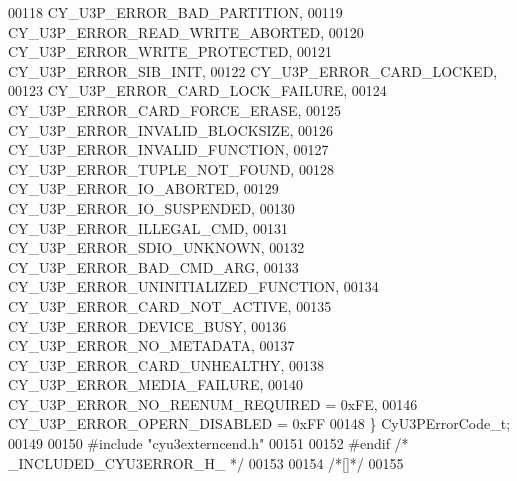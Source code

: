 \begin{DoxyCode}
00118     CY_U3P_ERROR_BAD_PARTITION,                 
00119     CY_U3P_ERROR_READ_WRITE_ABORTED,            
00120     CY_U3P_ERROR_WRITE_PROTECTED,               
00121     CY_U3P_ERROR_SIB_INIT,                      
00122     CY_U3P_ERROR_CARD_LOCKED,                   
00123     CY_U3P_ERROR_CARD_LOCK_FAILURE,             
00124     CY_U3P_ERROR_CARD_FORCE_ERASE,              
00125     CY_U3P_ERROR_INVALID_BLOCKSIZE,             
00126     CY_U3P_ERROR_INVALID_FUNCTION,              
00127     CY_U3P_ERROR_TUPLE_NOT_FOUND,               
00128     CY_U3P_ERROR_IO_ABORTED,                    
00129     CY_U3P_ERROR_IO_SUSPENDED,              
00130     CY_U3P_ERROR_ILLEGAL_CMD,                   
00131     CY_U3P_ERROR_SDIO_UNKNOWN,                  
00132     CY_U3P_ERROR_BAD_CMD_ARG,                   
00133     CY_U3P_ERROR_UNINITIALIZED_FUNCTION,        
00134     CY_U3P_ERROR_CARD_NOT_ACTIVE,               
00135     CY_U3P_ERROR_DEVICE_BUSY,                   
00136     CY_U3P_ERROR_NO_METADATA,           
00137     CY_U3P_ERROR_CARD_UNHEALTHY,        
00138     CY_U3P_ERROR_MEDIA_FAILURE,         
00140     CY_U3P_ERROR_NO_REENUM_REQUIRED = 0xFE, 
00146     CY_U3P_ERROR_OPERN_DISABLED = 0xFF      
00148 \} CyU3PErrorCode_t;
00149 
00150 \textcolor{preprocessor}{#include "cyu3externcend.h"}
00151 
00152 \textcolor{preprocessor}{#endif }\textcolor{comment}{/* \_INCLUDED\_CYU3ERROR\_H\_ */}\textcolor{preprocessor}{}
00153 
00154 \textcolor{comment}{/*[]*/}
00155 
\end{DoxyCode}
